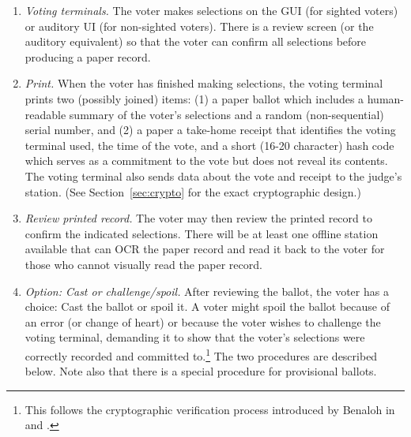 \begin{enumerate}
\item {\em Voting terminals.}
 The voter makes selections on the GUI (for sighted voters)
 or auditory UI (for non-sighted voters).
 There is a review screen (or the auditory equivalent)
 so that the voter can confirm all selections before producing a paper record.

\item {\em Print.} When the voter has finished making selections,
  the voting terminal prints two (possibly joined) items:
  (1) a paper ballot which includes a human-readable summary of the voter's selections
  and a random (non-sequential) serial number, and
  (2) a paper a take-home receipt that identifies the voting terminal used, the
  time of the vote, and a short (16-20 character) hash code which
  serves as a commitment to the vote but does not reveal its contents.
  The voting terminal also sends data about the vote and receipt
  to the judge's station. (See Section~\ref{sec:crypto} for the exact
  cryptographic design.)


 
% 

\item {\em Review printed record.}
The voter may then review the printed record to confirm the indicated
selections. There will be at least one offline station available that can OCR the paper record and read it back to the voter for those who cannot visually read the paper record.

\item {\em Option: Cast or challenge/spoil.}
After reviewing the ballot, the voter has a choice: Cast the ballot or spoil it.
 A voter might spoil the ballot because of an error (or change of heart)
 or because the voter wishes to challenge the voting terminal, demanding it to show
 that the voter's selections were correctly recorded and committed to.\footnote{
 This follows the cryptographic verification process introduced by Benaloh
 in \cite{benaloh06simple} and \cite{benaloh07evt}.}
 The two procedures are described below. Note also that there is a special procedure for provisional ballots.


\end{enumerate}
